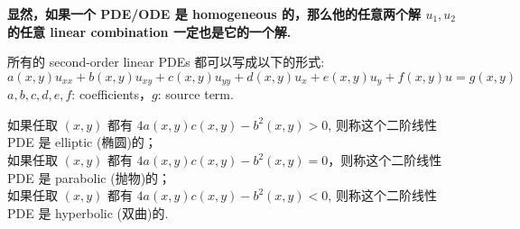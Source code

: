 \begin{proposition}
\textbf{显然，如果一个 PDE/ODE 是 homogeneous 的，那么他的任意两个解 $u_1, u_2$ 的任意 linear combination 一定也是它的一个解.}
\end{proposition}



\begin{example}
所有的 second-order linear PDEs 都可以写成以下的形式:
$$
a(x,y)u_{xx} + b(x,y)u_{xy} + c(x,y)u_{yy} + d(x,y)u_x + e(x,y)u_y + f(x,y)u = g(x,y)
$$
$a,b,c,d,e,f$:  coefficients，$g$: source term.
\end{example}

\begin{defn}
    如果任取 $(x,y)$ 都有 $4a(x,y)c(x,y) - b^2(x,y) >0$, 则称这个二阶线性 PDE 是 elliptic (椭圆)的；
    \\如果任取 $(x,y)$ 都有 $4a(x,y)c(x,y) - b^2(x,y) =0$，则称这个二阶线性 PDE 是 parabolic (抛物)的；
    \\如果任取 $(x,y)$ 都有 $4a(x,y)c(x,y) - b^2(x,y) <0$, 则称这个二阶线性 PDE 是 hyperbolic (双曲)的.
\end{defn}
